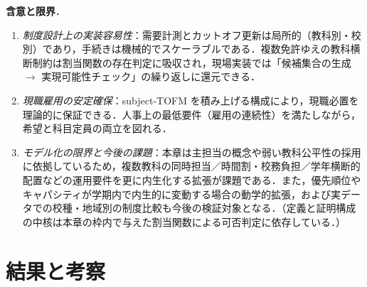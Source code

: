\documentclass[12pt, a4paper]{article}
\newcommand{\source}[1]{\par\noindent{\footnotesize #1}} %
\theoremstyle{definition}
\theoremstyle{remark}
\theoremstyle{plain}
\begin{document}
\medskip
\noindent\textbf{含意と限界}．
\begin{enumerate}\setlength{\itemsep}{2pt}
  \item \textit{制度設計上の実装容易性}：需要計測とカットオフ更新は局所的（教科別・校別）であり，手続きは機械的でスケーラブルである．複数免許ゆえの教科横断制約は割当関数の存在判定に吸収され，現場実装では「候補集合の生成 $\to$ 実現可能性チェック」の繰り返しに還元できる．
  \item \textit{現職雇用の安定確保}：subject-TOFM を積み上げる構成により，現職必置を理論的に保証できる．人事上の最低要件（雇用の連続性）を満たしながら，希望と科目定員の両立を図れる．
  \item \textit{モデル化の限界と今後の課題}：本章は主担当の概念や弱い教科公平性の採用に依拠しているため，複数教科の同時担当／時間割・校務負担／学年横断的配置などの運用要件を更に内生化する拡張が課題である．また，優先順位やキャパシティが学期内で内生的に変動する場合の動学的拡張，および実データでの校種・地域別の制度比較も今後の検証対象となる．（定義と証明構成の中核は本章の枠内で与えた割当関数による可否判定に依存している．）
\end{enumerate}





\section{結果と考察}


\end{document}
